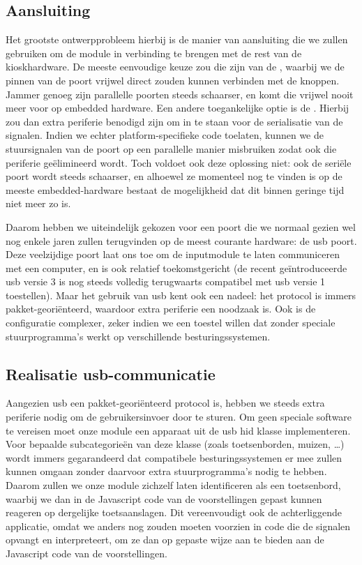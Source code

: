 \subsection{Aansluiting}

Het grootste ontwerpprobleem hierbij is de manier van aansluiting die we zullen gebruiken om de module in verbinding te brengen met de rest van de kioskhardware. De meeste eenvoudige keuze zou die zijn van de , waarbij we de pinnen van de poort vrijwel direct zouden kunnen verbinden met de knoppen. Jammer genoeg zijn parallelle poorten steeds schaarser, en komt die vrijwel nooit meer voor op embedded hardware. Een andere toegankelijke optie is de . Hierbij zou dan extra periferie benodigd zijn om in te staan voor de serialisatie van de signalen. Indien we echter platform-specifieke code toelaten, kunnen we de stuursignalen van de poort op een parallelle manier misbruiken zodat ook die periferie geëlimineerd wordt. Toch voldoet ook deze oplossing niet: ook de seriële poort wordt steeds schaarser, en alhoewel ze momenteel nog te vinden is op de meeste embedded-hardware bestaat de mogelijkheid dat dit binnen geringe tijd niet meer zo is.

Daarom hebben we uiteindelijk gekozen voor een poort die we normaal gezien wel nog enkele jaren zullen terugvinden op de meest courante hardware: de \ac{usb} poort. Deze veelzijdige poort laat ons toe om de inputmodule te laten communiceren met een computer, en is ook relatief toekomstgericht (de recent geïntroduceerde \ac{usb} versie 3 is nog steeds volledig terugwaarts compatibel met \ac{usb} versie 1 toestellen). Maar het gebruik van \ac{usb} kent ook een nadeel: het protocol is immers pakket-georiënteerd, waardoor extra periferie een noodzaak is. Ook is de configuratie complexer, zeker indien we een toestel willen dat zonder speciale stuurprogramma's werkt op verschillende besturingssystemen.

\subsection{Realisatie \acs{usb}-communicatie}

Aangezien \ac{usb} een pakket-georiënteerd protocol is, hebben we steeds extra periferie nodig om de gebruikersinvoer door te sturen. Om geen speciale software te vereisen moet onze module een apparaat uit de \ac{usb} \ac{hid} klasse implementeren. Voor bepaalde subcategorieën van deze klasse (zoals toetsenborden, muizen, \dots) wordt immers gegarandeerd dat compatibele besturingssystemen er mee zullen kunnen omgaan zonder daarvoor extra stuurprogramma's nodig te hebben. Daarom zullen we onze module zichzelf laten identificeren als een toetsenbord, waarbij we dan in de Javascript code van de voorstellingen gepast kunnen reageren op dergelijke toetsaanslagen. Dit vereenvoudigt ook de achterliggende applicatie, omdat we anders nog zouden moeten voorzien in code die de signalen opvangt en interpreteert, om ze dan op gepaste wijze aan te bieden aan de Javascript code van de voorstellingen.

